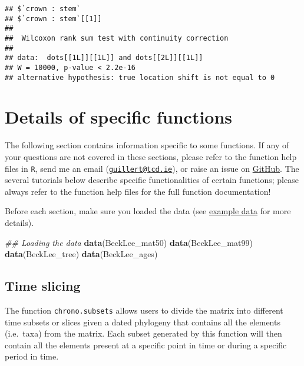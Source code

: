 \documentclass[
]{book}
\newenvironment{Shaded}{\begin{snugshade}}{\end{snugshade}}
\newcommand{\CommentTok}[1]{\textcolor[rgb]{0.56,0.35,0.01}{\textit{#1}}}
\newcommand{\KeywordTok}[1]{\textcolor[rgb]{0.13,0.29,0.53}{\textbf{#1}}}
\newcommand{\NormalTok}[1]{#1}
\begin{document}
\begin{verbatim}
## $`crown : stem`
## $`crown : stem`[[1]]
## 
##  Wilcoxon rank sum test with continuity correction
## 
## data:  dots[[1L]][[1L]] and dots[[2L]][[1L]]
## W = 10000, p-value < 2.2e-16
## alternative hypothesis: true location shift is not equal to 0
\end{verbatim}

\hypertarget{details-of-specific-functions}{%
\chapter{Details of specific functions}\label{details-of-specific-functions}}

The following section contains information specific to some functions.
If any of your questions are not covered in these sections, please refer to the function help files in \texttt{R}, send me an email (\href{mailto:guillert@tcd.ie}{\nolinkurl{guillert@tcd.ie}}), or raise an issue on \href{https://github.com/TGuillerme/dispRity/issues}{GitHub}.
The several tutorials below describe specific functionalities of certain functions; please always refer to the function help files for the full function documentation!

Before each section, make sure you loaded the \citet{beckancient2014} data (see \protect\hyperlink{example-data}{example data} for more details).

\begin{Shaded}
\begin{Highlighting}[]
\CommentTok{\#\# Loading the data}
\KeywordTok{data}\NormalTok{(BeckLee\_mat50)}
\KeywordTok{data}\NormalTok{(BeckLee\_mat99)}
\KeywordTok{data}\NormalTok{(BeckLee\_tree)}
\KeywordTok{data}\NormalTok{(BeckLee\_ages)}
\end{Highlighting}
\end{Shaded}

\hypertarget{chrono-subsets}{%
\section{Time slicing}\label{chrono-subsets}}

The function \texttt{chrono.subsets} allows users to divide the matrix into different time subsets or slices given a dated phylogeny that contains all the elements (i.e.~taxa) from the matrix.
Each subset generated by this function will then contain all the elements present at a specific point in time or during a specific period in time.
\end{document}
